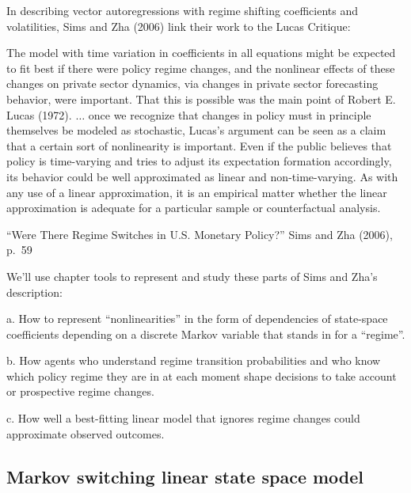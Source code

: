 In describing vector autoregressions with regime shifting coefficients and volatilities, Sims and Zha (2006)  link
their work to the Lucas Critique: %
\epigraph
{The model with time variation in coefficients in all equations might be expected to fit best if there were policy regime changes, and the nonlinear effects of these changes on private sector dynamics, via changes in private sector forecasting behavior, were important. That this is possible was the main point of Robert E. Lucas (1972).
$\ldots$ %
once we recognize that changes in policy must in principle themselves be modeled as stochastic, Lucas's argument can be seen as a claim that a certain sort of nonlinearity is important. Even if the public believes that policy is time-varying and tries to adjust its expectation formation accordingly, its behavior could be well approximated as linear and non-time-varying. As with any use of a linear approximation, it is an empirical matter whether the linear approximation is adequate for a particular sample or counterfactual analysis.}{``Were There Regime  Switches in U.S. Monetary Policy?'' Sims and Zha (2006), p.~59}


\noindent We'll use chapter  tools to represent and study these parts of Sims and Zha's description:

\item{a.} How to represent ``nonlinearities'' in the form of dependencies of state-space coefficients depending on a discrete  Markov variable that
stands in for a ``regime''.

\medskip
\item{b.} How agents who understand regime transition probabilities and who know which policy regime they are in at each moment
shape decisions to take account or prospective regime changes.

\medskip
\item{c.} How well a best-fitting linear model that ignores regime changes could approximate observed outcomes.  


\medskip

\subsection{Markov switching linear state space model}

